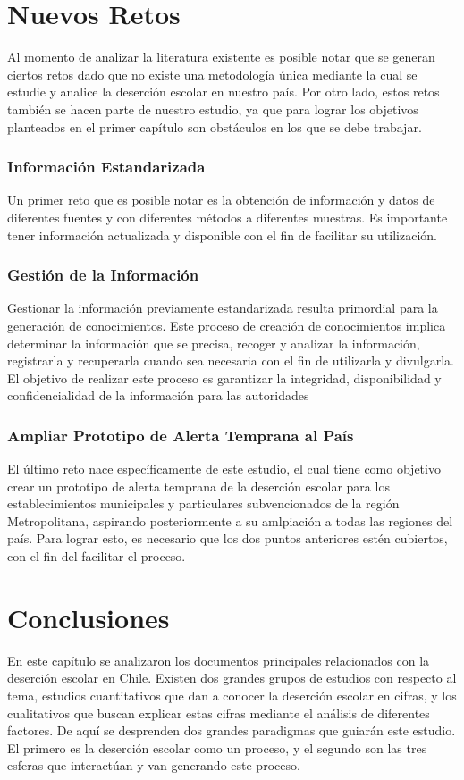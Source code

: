\section{Nuevos Retos}
Al momento de analizar la literatura existente es posible notar que se generan ciertos retos dado que no existe una metodología única mediante la cual se estudie y analice la deserción escolar en nuestro país. 
Por otro lado, estos retos también se hacen parte de nuestro estudio, ya que para lograr los objetivos planteados en el primer capítulo son obstáculos en los que se debe trabajar. 
\subsubsection{Información Estandarizada}
Un primer reto que es posible notar es la obtención de información y datos de diferentes fuentes y con diferentes métodos a diferentes muestras. 
Es importante tener información actualizada y disponible con el fin de facilitar su utilización. 
\subsubsection{Gestión de la Información}
Gestionar la información previamente estandarizada resulta primordial para la generación de conocimientos. Este proceso de creación de conocimientos implica determinar la información que se precisa, recoger y analizar la información, registrarla y recuperarla cuando sea necesaria con el fin de utilizarla y divulgarla. 
El objetivo de realizar este proceso es garantizar la integridad, disponibilidad y confidencialidad de la información para las autoridades 
\subsubsection{Ampliar Prototipo de Alerta Temprana al País}
El último reto nace específicamente de este estudio, el cual tiene como objetivo crear un prototipo de alerta temprana de la deserción escolar para los establecimientos municipales y particulares subvencionados de la región Metropolitana, aspirando posteriormente a su amlpiación a todas las regiones del país. Para lograr esto, es necesario que los dos puntos anteriores estén cubiertos, con el fin del facilitar el proceso.

\section{Conclusiones}
En este capítulo se analizaron los documentos principales relacionados con la deserción escolar en Chile. Existen dos grandes grupos de estudios con respecto al tema, estudios cuantitativos que dan a conocer la deserción escolar en cifras, y los cualitativos que buscan explicar estas cifras mediante el análisis de diferentes factores. De aquí se desprenden dos grandes paradigmas que guiarán este estudio. El primero es la deserción escolar como un proceso, y el segundo son las tres esferas que interactúan y van generando este proceso. 

